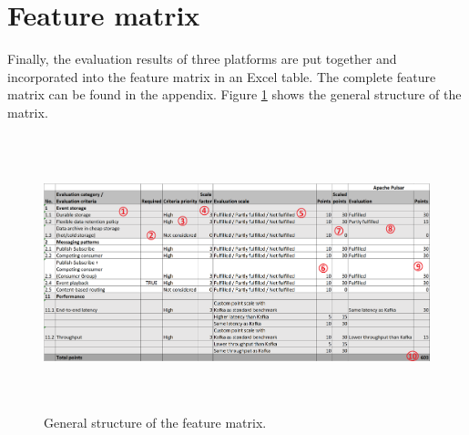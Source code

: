 \section{Feature matrix} 
Finally, the evaluation results of three platforms are put together and incorporated into the feature matrix in an Excel table. The complete feature matrix can be found in the appendix. Figure \ref{fig:featurematrix} shows the general structure of the matrix.


\begin{figure}[h]
	\begin{adjustwidth}{-1.5cm}{}
	\centering
	\includegraphics[width=18cm,height=8cm]{images/feature-matrix.png}
	\end{adjustwidth}
	\caption{General structure of the feature matrix.}
	\label{fig:featurematrix}
\end{figure}

